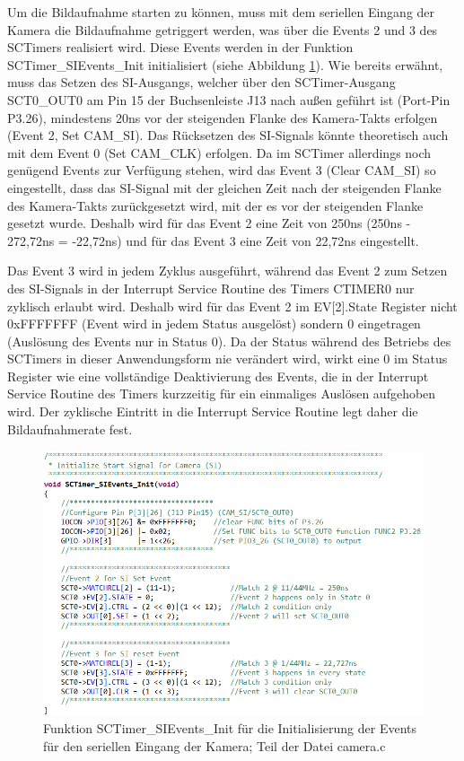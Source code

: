 Um die Bildaufnahme starten zu können, muss mit dem seriellen Eingang der Kamera die Bildaufnahme getriggert werden, was über die Events 2 und 3 des SCTimers realisiert wird. Diese Events werden in der Funktion \glqq{}SCTimer\_SIEvents\_Init\grqq{} initialisiert (siehe Abbildung \ref{fig:SCTimerSIEventsInit}). Wie bereits erwähnt, muss das Setzen des SI-Ausgangs, welcher über den SCTimer-Ausgang SCT0\_OUT0 am Pin 15 der Buchsenleiste J13 nach außen geführt ist (Port-Pin P3.26), mindestens 20ns vor der steigenden Flanke des Kamera-Takts erfolgen (Event 2, Set CAM\_SI). Das Rücksetzen des SI-Signals könnte theoretisch auch mit dem Event 0 (Set CAM\_CLK) erfolgen. Da im SCTimer allerdings noch genügend Events zur Verfügung stehen, wird das Event 3 (Clear CAM\_SI) so eingestellt, dass das SI-Signal mit der gleichen Zeit nach der steigenden Flanke des Kamera-Takts zurückgesetzt wird, mit der es vor der steigenden Flanke gesetzt wurde. Deshalb wird für das Event 2 eine Zeit von 250ns (250ns - 272,72ns = -22,72ns) und für das Event 3 eine Zeit von 22,72ns eingestellt.\vspace{11pt}

Das Event 3 wird in jedem Zyklus ausgeführt, während das Event 2 zum Setzen des SI-Signals in der Interrupt Service Routine des Timers CTIMER0 nur zyklisch erlaubt wird. Deshalb wird für das Event 2 im EV[2].State Register nicht 0xFFFFFFF (Event wird in jedem Status ausgelöst) sondern 0 eingetragen (Auslösung des Events nur in Status 0). Da der Status während des Betriebs des SCTimers in dieser Anwendungsform nie verändert wird, wirkt eine 0 im Status Register wie eine vollständige Deaktivierung des Events, die in der Interrupt Service Routine des Timers kurzzeitig für ein einmaliges Auslösen aufgehoben wird. Der zyklische Eintritt in die Interrupt Service Routine legt daher die Bildaufnahmerate fest.

\begin{figure}[H] %
\includegraphics[width=.95\textwidth]{sec7/images/code/SCTimerSIEventsInit} 
\centering
\captionsetup{width=.95\textwidth}
\caption[Funktion \glqq{}SCTimer\_SIEvents\_Init\grqq{} aus der Datei \glqq{}camera.c\grqq{}]{Funktion \glqq{}SCTimer\_SIEvents\_Init\grqq{} für die Initialisierung der Events für den seriellen Eingang der Kamera; Teil der Datei \glqq{}camera.c\grqq{}}\centering
\label{fig:SCTimerSIEventsInit}
\end{figure}


